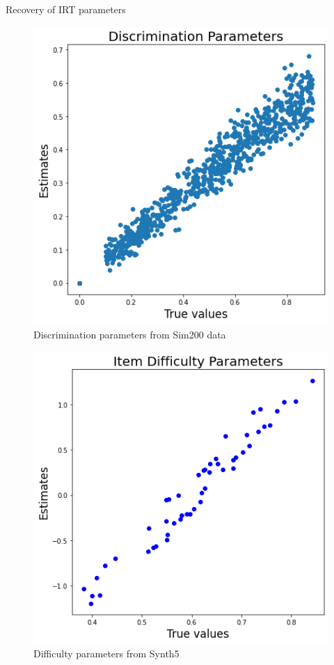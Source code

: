\documentclass{beamer}
\theoremstyle{definition}
\let\oldfootnotesize\footnotesize
\renewcommand*{\footnotesize}{\oldfootnotesize\tiny}
\begin{document}
\begin{frame}{Recovery of IRT parameters}
  \centering
  \begin{figure}
    \includegraphics[width=.95\textwidth]{../img/kt_irt/disc_est_attn2.png}
    \caption*{\footnotesize Discrimination parameters from Sim200 data}
  \end{figure}
  \endminipage
  \centering
  \begin{figure}
    \includegraphics[width=.95\textwidth]{../img/kt_irt/synth5_diff_est_lstm.png}
    \caption*{\footnotesize Difficulty parameters from Synth5}
  \end{figure}
  \endminipage
\end{frame}
\end{document}
